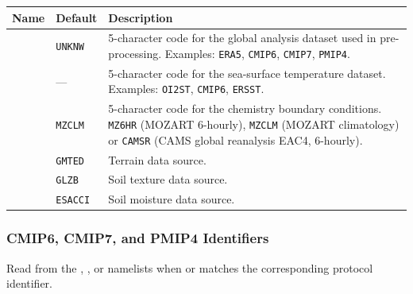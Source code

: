 \begin{longtable}{L{4cm} L{3cm} L{7cm}}
  \toprule
  \textbf{Name} & \textbf{Default} & \textbf{Description} \\
  \midrule
  \endhead
  \bottomrule
  \endfoot
    & \texttt{UNKNW} &
    5-character code for the global analysis dataset used in pre-processing.
    Examples: \texttt{ERA5}, \texttt{CMIP6}, \texttt{CMIP7}, \texttt{PMIP4}. \\
    & ---           &
    5-character code for the sea-surface temperature dataset.
    Examples: \texttt{OI2ST}, \texttt{CMIP6}, \texttt{ERSST}. \\
   & \texttt{MZCLM}&
    5-character code for the chemistry boundary conditions.
    \texttt{MZ6HR} (MOZART 6-hourly), \texttt{MZCLM} (MOZART climatology) or
    \texttt{CAMSR} (CAMS global reanalysis EAC4, 6-hourly). \\
    & \texttt{GMTED}& Terrain data source. \\
    & \texttt{GLZB} & Soil texture data source. \\
     & \texttt{ESACCI}& Soil moisture data source. \\
\end{longtable}

\subsubsection{CMIP6, CMIP7, and PMIP4 Identifiers}

Read from the , , or 
namelists when  or  matches the corresponding
protocol identifier.

